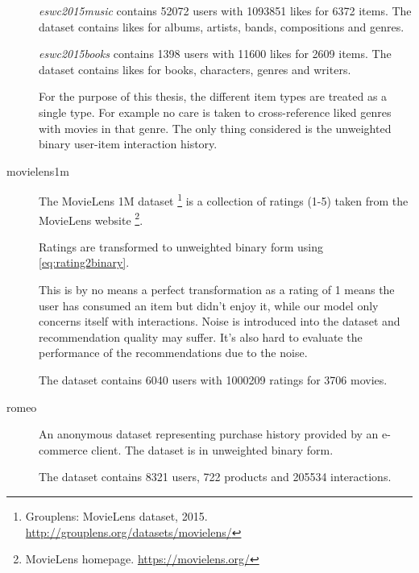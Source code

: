 \begin{description}
        \textit{eswc2015music} contains 52072 users with 1093851 likes for 6372 items. The dataset contains likes for albums, artists, bands, compositions and genres.

        \textit{eswc2015books} contains 1398 users with 11600 likes for 2609 items. The dataset contains likes for books, characters, genres and writers.

        For the purpose of this thesis, the different item types are treated as a single type. For example no care is taken to cross-reference liked genres with movies in that genre. The only thing considered is the unweighted binary user-item interaction history.





    \item[movielens1m] \hfill

        The MovieLens 1M dataset \footnote{Grouplens: MovieLens dataset, 2015. \url{http://grouplens.org/datasets/movielens/}} is a collection of ratings (1-5) taken from the MovieLens website \footnote{MovieLens homepage. \url{https://movielens.org/}}.

        Ratings are transformed to unweighted binary form using \eqref{eq:rating2binary}.

        This is by no means a perfect transformation as a rating of 1 means the user has consumed an item but didn't enjoy it, while our model only concerns itself with interactions. Noise is introduced into the dataset and recommendation quality may suffer. It's also hard to evaluate the performance of the recommendations due to the noise.

        The dataset contains 6040 users with 1000209 ratings for 3706 movies.



    \item[romeo] \hfill

        An anonymous dataset representing purchase history provided by an e-commerce client. The dataset is in unweighted binary form.

        The dataset contains 8321 users, 722 products and 205534 interactions.



\end{description}


